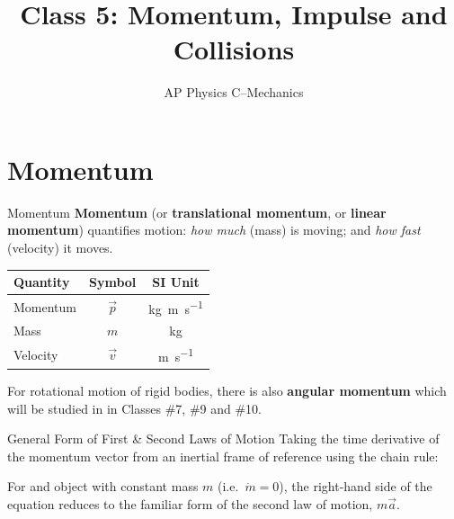 \documentclass[12pt,compress,aspectratio=169]{beamer}
\title{Class 5: Momentum, Impulse and Collisions}
\subtitle{AP Physics C--Mechanics}
\begin{document}
\begin{frame}
  \maketitle
\end{frame}



\section{Momentum}

\begin{frame}{Momentum}
  \textbf{Momentum} (or \textbf{translational momentum}, or \textbf{linear
    momentum}) quantifies motion: \emph{how much} (mass) is moving; and
  \emph{how fast} (velocity) it moves.

  \begin{center}
    \begin{tabular}{l|c|c}
      \rowcolor{pink}
      \textbf{Quantity}   & \textbf{Symbol} & \textbf{SI Unit} \\ \hline
      Momentum  & $\vec p$ & \si{\kilo\gram\metre\per\second} \\
      Mass      & $m$     & \si{\kilo\gram} \\
      Velocity  & $\vec v$ & \si{\metre\per\second}
    \end{tabular}
  \end{center}
  For rotational motion of rigid bodies, there is also \textbf{angular momentum}
  which will be studied in in Classes \#7, \#9 and \#10.
\end{frame}



\begin{frame}{General Form of First \& Second Laws of Motion}
  Taking the time derivative of the momentum vector from an inertial frame of
  reference using the chain rule:


  For and object with constant mass $m$ (i.e.\ $\dot m=0$), the right-hand side
  of the equation reduces to the familiar form of the second law of motion,
  $m\vec a$.
\end{frame}
\end{document}
